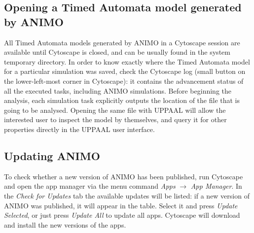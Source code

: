\documentclass{article}
\begin{document}
\subsection{Opening a Timed Automata model generated by ANIMO}
All Timed Automata models generated by ANIMO in a Cytoscape session are available
until Cytoscape is closed, and can be usually found in the system temporary directory.
In order to know exactly where the Timed Automata model for a particular simulation
was saved, check the Cytoscape log (small button on the lower-left-most corner in Cytoscape):
it contains the advancement status of all the executed tasks, including ANIMO simulations.
Before beginning the analysis, each simulation task explicitly outputs the location
of the file that is going to be analysed. Opening the same file with UPPAAL will allow
the interested user to inspect the model by themselves, and query it for other properties
directly in the UPPAAL user interface.


\subsection{Updating ANIMO}
To check whether a new version of ANIMO has been published, run Cytoscape and open
the app manager via the menu command \emph{Apps} $\rightarrow$ \emph{App Manager}.
In the \emph{Check for Updates} tab the available updates will be listed:
if a new version of ANIMO was published, it will appear in the table. Select it
and press \emph{Update Selected}, or just press \emph{Update All} to update all apps.
Cytoscape will download and install the new versions of the apps.
\end{document}
